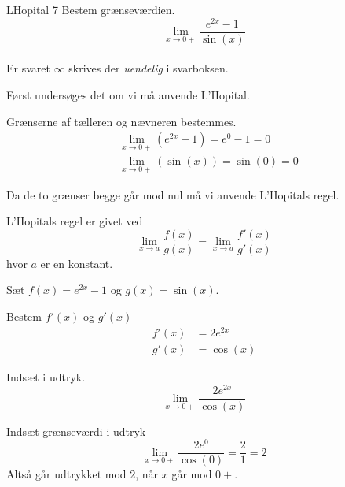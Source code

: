 \documentclass{article}
\begin{document}
\begin{exercise}{LHopital 7}
	Bestem grænseværdien.
	\[
	\lim_{x \to 0+} \frac{e^{2x} - 1}{\sin(x)}
	\] 
	\\
	Er svaret $\infty$ skrives der \emph{uendelig} i svarboksen.
	
	
	\hint
	Først undersøges det om vi må anvende L'Hopital.
	
	\hint
	Grænserne af tælleren og nævneren bestemmes.
	\begin{align*}
		&\lim_{x \to 0+} (e^{2x} - 1) = e^{0} - 1 = 0 \\
		&\lim_{x \to 0+} (\sin(x)) = \sin(0) = 0
	\end{align*}
	
	\hint
	Da de to grænser begge går mod nul må vi  anvende L'Hopitals regel. 
	
	\hint
	L'Hopitals regel er givet ved
	\[
	\lim_{x \to a} \frac{f(x)}{g(x)} = \lim_{x \to a} \frac{f'(x)}{g'(x)} 
	\]
	hvor $a$  er en konstant.
	
	\hint
	Sæt $f(x) = e^{2x} - 1 $ og $g(x) = \sin(x)$. 
	
	\hint
	Bestem $f'(x)$ og $g'(x)$
	\begin{align*}
		f'(x) &= 2 e^{2x} \\
		g'(x) &= \cos(x)
	\end{align*}
	
	\hint
	Indsæt i udtryk.
	\[
	\lim_{x \to 0+} \frac{2 e^{2x}}{\cos(x)} 
	\]
	
	\hint
	Indsæt grænseværdi i udtryk
	\[
	\lim_{x \to 0+} \frac{2 e^{0}}{\cos(0)}  =  \frac{2}{1} = 2 
	\]
	Altså går udtrykket mod $2$, når $x$ går mod $0+$. 
	
\end{exercise}
\end{document}
